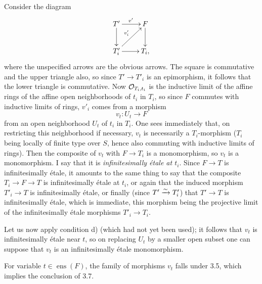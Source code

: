 Consider the diagram
\[
\xymatrix{T'\ar[r]^{v'}\ar[d]&F\ar[d]\\T'_i\ar[r]\ar[ur]^{v'_i}&T_i,}
\]
where the unspecified arrows are the obvious arrows. The square is commutative and the upper triangle also, so since $T'\to T'_i$ is an epimorphism, it follows that the lower triangle is commutative. Now $\mathcal{O}_{T_i,t_i}$ is the inductive limit of the affine rings of the affine open neighborhoods of $t_i$ in $T_i$, so since $F$ commutes with inductive limits of rings, $v'_i$ comes from a morphism
\[
v_t:U_t\to F
\]
from an open neighborhood $U_t$ of $t_i$ in $T_i$. One sees immediately that, on restricting this neighborhood if necessary, $v_t$ is necessarily a $T_i$-morphism ($T_i$ being locally of finite type over $S$, hence also commuting with inductive limits of rings). Then the composite of $v_t$ with $F\to T_i$ is a monomorphism, so $v_t$ is a monomorphism. I say that it is \emph{infinitesimally étale at $t_i$}. Since $F\to T$ is infinitesimally étale, it amounts to the same thing to say that the composite $T_i\to F\to T$ is infinitesimally étale at $t_i$, or again that the induced morphism $T'_i\to T$ is infinitesimally étale, or finally (since $T'\xrightarrow{\sim} T'_i$) that $T'\to T$ is infinitesimally étale, which is immediate, this morphism being the projective limit of the infinitesimally étale morphisms $T'_i\to T_i$.

Let us now apply condition d) (which had not yet been used); it follows that $v_t$ is infinitesimally étale near $t$, so on replacing $U_t$ by a smaller open subset one can suppose that $v_t$ is an infinitesimally étale monomorphism.

For variable $t\in\operatorname{ens}(F)$, the family of morphisms $v_t$ falls under 3.5, which implies the conclusion of 3.7.

